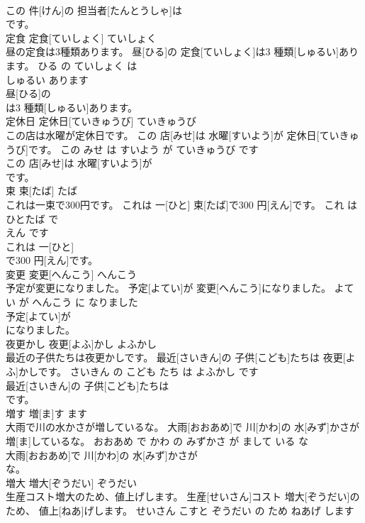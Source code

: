 \documentclass[8pt]{extreport}
\begin{document}
\begin{CJK}{UTF8}{min}
\\	この 件[けん]の 担当者[たんとうしゃ]は
\\	です。			
\\	定食	定食[ていしょく]	ていしょく	
\\	昼の定食は3種類あります。	昼[ひる]の 定食[ていしょく]は3 種類[しゅるい]あります。	ひる の ていしょく は 
\\	しゅるい あります	
\\	昼[ひる]の
\\	は3 種類[しゅるい]あります。			
\\	定休日	定休日[ていきゅうび]	ていきゅうび	
\\	この店は水曜が定休日です。	この 店[みせ]は 水曜[すいよう]が 定休日[ていきゅうび]です。	この みせ は すいよう が ていきゅうび です	
\\	この 店[みせ]は 水曜[すいよう]が
\\	です。			
\\	束	束[たば]	たば	
\\	これは一束で300円です。	これは 一[ひと] 束[たば]で300 円[えん]です。	これ は ひとたば で 
\\	えん です	
\\	これは 一[ひと]
\\	で300 円[えん]です。			
\\	変更	変更[へんこう]	へんこう	
\\	予定が変更になりました。	予定[よてい]が 変更[へんこう]になりました。	よてい が へんこう に なりました	
\\	予定[よてい]が
\\	になりました。			
\\	夜更かし	夜更[よふ]かし	よふかし	
\\	最近の子供たちは夜更かしです。	最近[さいきん]の 子供[こども]たちは 夜更[よふ]かしです。	さいきん の こども たち は よふかし です	
\\	最近[さいきん]の 子供[こども]たちは
\\	です。			
\\	増す	増[ま]す	ます	
\\	大雨で川の水かさが増しているな。	大雨[おおあめ]で 川[かわ]の 水[みず]かさが 増[ま]しているな。	おおあめ で かわ の みずかさ が まして いる な	
\\	大雨[おおあめ]で 川[かわ]の 水[みず]かさが
\\	な。			
\\	増大	増大[ぞうだい]	ぞうだい	
\\	生産コスト増大のため、値上げします。	生産[せいさん]コスト 増大[ぞうだい]のため、 値上[ねあ]げします。	せいさん こすと ぞうだい の ため ねあげ します	

\end{CJK}
\end{document}
